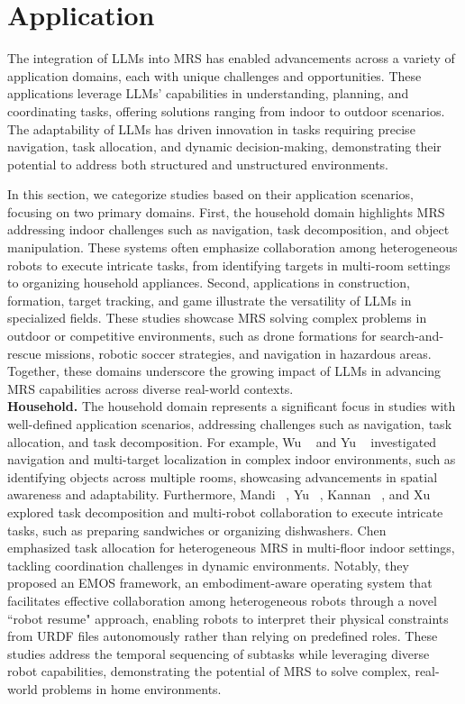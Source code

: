 \section{Application}\label{sec:5-application}
The integration of LLMs into MRS has enabled advancements across a variety of application domains, each with unique challenges and opportunities. These applications leverage LLMs' capabilities in understanding, planning, and coordinating tasks, offering solutions ranging from indoor to outdoor scenarios. The adaptability of LLMs has driven innovation in tasks requiring precise navigation, task allocation, and dynamic decision-making, demonstrating their potential to address both structured and unstructured environments.

In this section, we categorize studies based on their application scenarios, focusing on two primary domains. First, the household domain highlights MRS addressing indoor challenges such as navigation, task decomposition, and object manipulation. These systems often emphasize collaboration among heterogeneous robots to execute intricate tasks, from identifying targets in multi-room settings to organizing household appliances. Second, applications in construction, formation, target tracking, and game illustrate the versatility of LLMs in specialized fields. These studies showcase MRS solving complex problems in outdoor or competitive environments, such as drone formations for search-and-rescue missions, robotic soccer strategies, and navigation in hazardous areas. Together, these domains underscore the growing impact of LLMs in advancing MRS capabilities across diverse real-world contexts.\\

\noindent \textbf{Household.} The household domain represents a significant focus in studies with well-defined application scenarios, addressing challenges such as navigation, task allocation, and task decomposition. For example, Wu \etal~\cite{wu_camon_2024} and Yu \etal~\cite{yu_co-navgpt_2023} investigated navigation and multi-target localization in complex indoor environments, such as identifying objects across multiple rooms, showcasing advancements in spatial awareness and adaptability. Furthermore, Mandi \etal~\cite{mandi_roco_2024}, Yu \etal~\cite{yu_mhrc_2024}, Kannan \etal~\cite{kannan_smart-llm_2024}, and Xu \etal~\cite{xu_scaling_2024} explored task decomposition and multi-robot collaboration to execute intricate tasks, such as preparing sandwiches or organizing dishwashers. Chen \etal~\cite{chen_scalable_2024} emphasized task allocation for heterogeneous MRS in multi-floor indoor settings, tackling coordination challenges in dynamic environments. Notably, they proposed an EMOS framework, an embodiment-aware operating system that facilitates effective collaboration among heterogeneous robots through a novel ``robot resume" approach, enabling robots to interpret their physical constraints from URDF files autonomously rather than relying on predefined roles. These studies address the temporal sequencing of subtasks while leveraging diverse robot capabilities, demonstrating the potential of MRS to solve complex, real-world problems in home environments.\\

